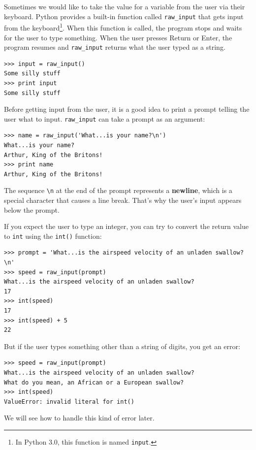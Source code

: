 \documentclass[10pt]{book}
\begin{document}
Sometimes we would like to take the value for a variable from the user
via their keyboard.
Python provides a built-in function called \verb"raw_input" that gets
input from the keyboard\footnote{In Python 3.0, this function is named
  {\tt input}.}.  When this function is called, the program stops and
waits for the user to type something.  When the user presses {\sf
  Return} or {\sf Enter}, the program resumes and \verb"raw_input"
returns what the user typed as a string.


\beforeverb
\begin{verbatim}
>>> input = raw_input()
Some silly stuff
>>> print input
Some silly stuff
\end{verbatim}
\afterverb
%
Before getting input from the user, it is a good idea to print a
prompt telling the user what to input.  \verb"raw_input" can take a
prompt as an argument:


\beforeverb
\begin{verbatim}
>>> name = raw_input('What...is your name?\n')
What...is your name?
Arthur, King of the Britons!
>>> print name
Arthur, King of the Britons!
\end{verbatim}
\afterverb
%
The sequence \verb"\n" at the end of the prompt represents a {\bf newline},
which is a special character that causes a line break.
That's why the user's input appears below the prompt.


If you expect the user to type an integer, you can try to convert
the return value to {\tt int} using the {\tt int()} function:

\beforeverb
\begin{verbatim}
>>> prompt = 'What...is the airspeed velocity of an unladen swallow?\n'
>>> speed = raw_input(prompt)
What...is the airspeed velocity of an unladen swallow?
17
>>> int(speed)
17
>>> int(speed) + 5
22
\end{verbatim}
\afterverb
%
But if the user types something other than a string of digits,
you get an error:

\beforeverb
\begin{verbatim}
>>> speed = raw_input(prompt)
What...is the airspeed velocity of an unladen swallow?
What do you mean, an African or a European swallow?
>>> int(speed)
ValueError: invalid literal for int()
\end{verbatim}
\afterverb
%
We will see how to handle this kind of error later.
\end{document}

